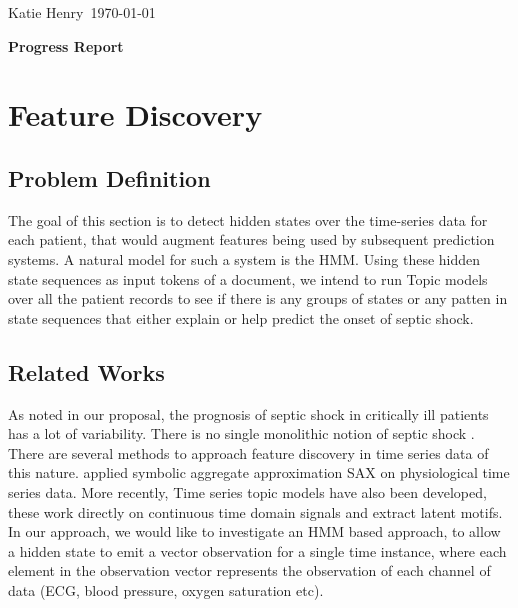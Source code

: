 \documentclass[12pt,solutions]{article}
\newcommand{\prof}{Katie Henry}
\newcommand{\topic}{MLCD Project}
\newlength{\toppush}
\newcommand{\htitle} 
{
    \noindent\vspace*{-\toppush}\newline\parbox{6.5in}
    {
        \vspace{-.85cm}
        \prof\hfill \ 
	 \today
	\vspace*{-.5ex}\newline
        \mbox{}\hrulefill\mbox{}
    }
    \vspace*{1ex}\mbox{}\newline
    \begin{center}{
        \large\bf{Progress Report} }\end{center}
}
\newcommand{\handout}
{
    \thispagestyle{empty}
    \markboth{\topic}{\topic}
    \pagestyle{myheadings}
    \htitle
}
\begin{document}
\handout

\setlength{\parindent}{0pt}


\setcounter{section}{2}
\section{Feature Discovery}
\subsection{Problem Definition}
The goal of this section is to detect hidden states over the time-series data for each patient, that would augment features being used by subsequent prediction systems. A natural model for such a system is the HMM. Using these hidden state sequences as input tokens of a document, we intend to run Topic models over all the patient records to see if there is any groups of states or any patten in state sequences that either explain or help predict the onset of septic shock.
\subsection{Related Works}
As noted in our proposal, the prognosis of septic shock in critically ill patients has a lot of variability. There is no single monolithic notion of septic shock \cite{Shavdia2007} . There are several methods to approach feature discovery in time series data of this nature. \cite{Esbroeck2012hrt}  applied symbolic aggregate approximation SAX \cite{Lin2003sax} on physiological time series data. More recently, Time series topic models have also been developed, \cite{SariaThesis2011} these work directly on continuous time domain signals and extract latent motifs. In our approach, we would like to investigate an HMM based approach, to allow a hidden state to emit a vector observation for a single time instance, where each element in the observation vector represents the observation of each channel of data (ECG, blood pressure, oxygen saturation etc).
\end{document}
